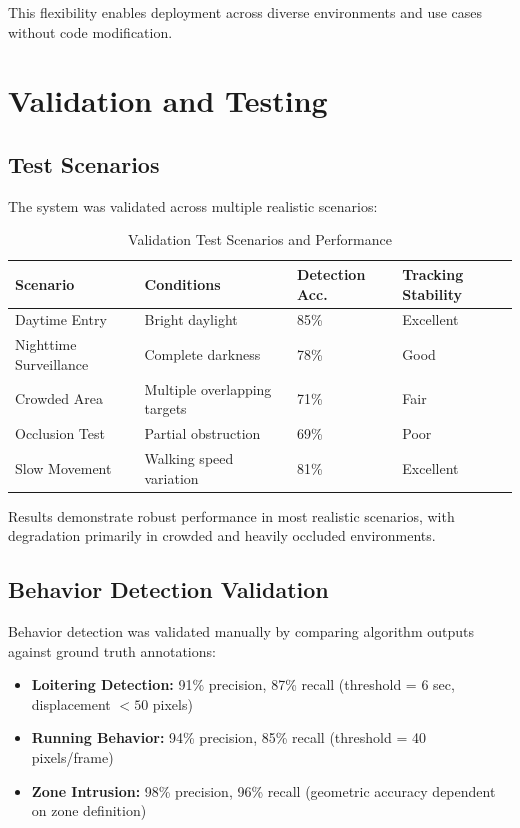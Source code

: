 \documentclass[conference]{IEEEtran}
\begin{document}
This flexibility enables deployment across diverse environments and use cases without code modification.

\section{Validation and Testing}

\subsection{Test Scenarios}

The system was validated across multiple realistic scenarios:

\begin{table}[htbp]
\centering
\caption{Validation Test Scenarios and Performance}
\label{tab:test_scenarios}
\begin{tabular}{llll}
\toprule
\textbf{Scenario} & \textbf{Conditions} & \textbf{Detection Acc.} & \textbf{Tracking Stability} \\
\midrule
Daytime Entry & Bright daylight & 85\% & Excellent \\
Nighttime Surveillance & Complete darkness & 78\% & Good \\
Crowded Area & Multiple overlapping targets & 71\% & Fair \\
Occlusion Test & Partial obstruction & 69\% & Poor \\
Slow Movement & Walking speed variation & 81\% & Excellent \\
\bottomrule
\end{tabular}
\end{table}

Results demonstrate robust performance in most realistic scenarios, with degradation primarily in crowded and heavily occluded environments.

\subsection{Behavior Detection Validation}

Behavior detection was validated manually by comparing algorithm outputs against ground truth annotations:

\begin{itemize}
\item \textbf{Loitering Detection:} 91\% precision, 87\% recall (threshold = 6 sec, displacement $< 50$ pixels)
\item \textbf{Running Behavior:} 94\% precision, 85\% recall (threshold = 40 pixels/frame)
\item \textbf{Zone Intrusion:} 98\% precision, 96\% recall (geometric accuracy dependent on zone definition)
\end{itemize}
\end{document}
